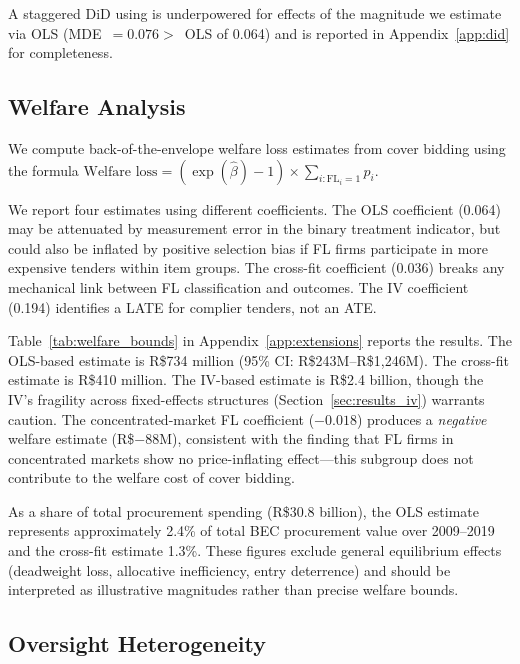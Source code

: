 A staggered DiD using \citet{callaway2021difference} is underpowered %
for effects of the magnitude we estimate via OLS (MDE~$= 0.076 >$~OLS
of 0.064) and is reported in Appendix~\ref{app:did} for completeness.

\subsection{Welfare Analysis}
\label{sec:welfare}

We compute back-of-the-envelope welfare loss estimates from cover %
bidding using the formula
$\text{Welfare loss} = (\exp(\hat{\beta}) - 1) \times
\sum_{i: \text{FL}_i = 1} p_i$.

We report four estimates using different coefficients. The OLS
coefficient (0.064) may be attenuated by measurement error in the binary
treatment indicator, but could also be inflated by positive selection
bias if FL firms participate in more expensive tenders within item
groups. The cross-fit coefficient (0.036) breaks any mechanical link
between FL classification and outcomes. The IV coefficient (0.194)
identifies a LATE for complier tenders, not an ATE.

Table~\ref{tab:welfare_bounds} in Appendix~\ref{app:extensions} reports
the results. The OLS-based estimate is R\$734 million (95\% CI:
R\$243M--R\$1,246M). The cross-fit estimate is R\$410 million. The
IV-based estimate is R\$2.4 billion, though the IV's fragility across
fixed-effects structures (Section~\ref{sec:results_iv}) warrants caution.
The concentrated-market FL coefficient ($-0.018$) produces a %
\emph{negative} welfare estimate (R\$$-88$M), consistent with the
finding that FL firms in concentrated markets show no price-inflating
effect---this subgroup does not contribute to the welfare cost of cover
bidding.

As a share of total procurement spending (R\$30.8 billion), the OLS
estimate represents approximately 2.4\% of total BEC procurement
value over 2009--2019 and the cross-fit estimate 1.3\%.
These figures exclude general equilibrium effects (deadweight loss,
allocative inefficiency, entry deterrence) and should be interpreted
as illustrative magnitudes rather than precise welfare bounds.

\subsection{Oversight Heterogeneity}

